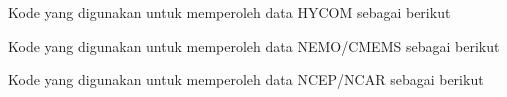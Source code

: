 Kode yang digunakan untuk memperoleh data HYCOM sebagai berikut


Kode yang digunakan untuk memperoleh data NEMO/CMEMS sebagai berikut


Kode yang digunakan untuk memperoleh data NCEP/NCAR sebagai berikut
